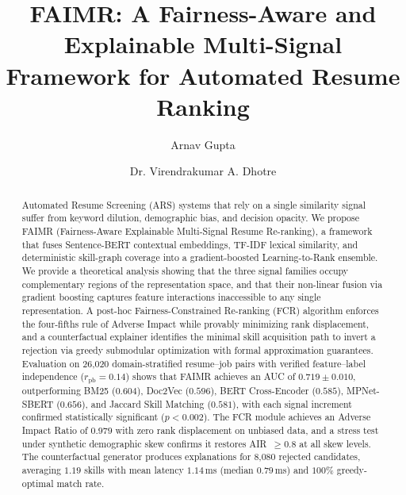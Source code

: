 \documentclass{svproc}
\begin{document}
\mainmatter

\title{FAIMR: A Fairness-Aware and Explainable Multi-Signal Framework for Automated Resume Ranking}


\author{Arnav Gupta \and Dr. Virendrakumar A. Dhotre}




\maketitle

\begin{abstract}
Automated Resume Screening (ARS) systems that rely on a single similarity signal suffer from keyword dilution, demographic bias, and decision opacity. We propose FAIMR (Fairness-Aware Explainable Multi-Signal Resume Re-ranking), a framework that fuses Sentence-BERT contextual embeddings, TF-IDF lexical similarity, and deterministic skill-graph coverage into a gradient-boosted Learning-to-Rank ensemble. We provide a theoretical analysis showing that the three signal families occupy complementary regions of the representation space, and that their non-linear fusion via gradient boosting captures feature interactions inaccessible to any single representation. A post-hoc Fairness-Constrained Re-ranking (FCR) algorithm enforces the four-fifths rule of Adverse Impact while provably minimizing rank displacement, and a counterfactual explainer identifies the minimal skill acquisition path to invert a rejection via greedy submodular optimization with formal approximation guarantees. Evaluation on 26,020 domain-stratified resume--job pairs with verified feature--label independence ($r_{\mathrm{pb}}{=}0.14$) shows that FAIMR achieves an AUC of $0.719 \pm 0.010$, outperforming BM25 ($0.604$), Doc2Vec ($0.596$), BERT Cross-Encoder ($0.585$), MPNet-SBERT ($0.656$), and Jaccard Skill Matching ($0.581$), with each signal increment confirmed statistically significant ($p < 0.002$). The FCR module achieves an Adverse Impact Ratio of $0.979$ with zero rank displacement on unbiased data, and a stress test under synthetic demographic skew confirms it restores AIR~$\geq 0.8$ at all skew levels. The counterfactual generator produces explanations for 8,080 rejected candidates, averaging $1.19$ skills with mean latency $1.14$\,ms (median $0.79$\,ms) and $100\%$ greedy-optimal match rate.
\end{abstract}
\end{document}
